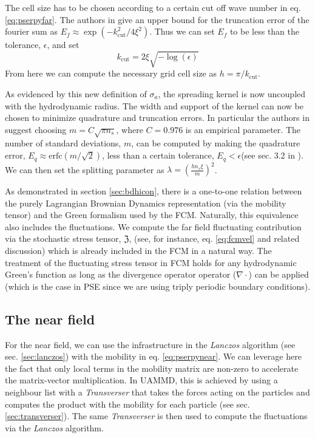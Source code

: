\documentclass[ twoside,openright,titlepage,numbers=noenddot,%
headinclude,footinclude,cleardoublepage=empty,abstract=on,
BCOR=5mm,paper=a4,fontsize=11pt, dvipsnames
]{scrreprt}
\newcommand{\uammd}{\gls{UAMMD}\xspace}
\begin{document}
The cell size has to be chosen according to a certain cut off wave number in eq. \eqref{eq:pserpyfar}. The authors in \cite{Lindbo2010} give an upper bound for the truncation error of the fourier sum as $E_f \approx \exp(-k_{\textrm{cut}}^2/4\xi^2)$. Thus we can set $E_f$ to be less than the tolerance, $\epsilon$, and set
\begin{equation}
  k_{\textrm{cut}} = 2\xi\sqrt{-\log(\epsilon)}
\end{equation}
From here we can compute the necessary grid cell size as $h = \pi/k_{\textrm{cut}}$.

As evidenced by this new definition of $\sigma_a$, the spreading kernel is now uncoupled with the hydrodynamic radius. The width and support of the kernel can now be chosen to minimize quadrature and truncation errors. In particular the authors in \cite{Lindbo2011} suggest choosing $m = C\sqrt{\pi n_s}$, where $C = 0.976$ is an empirical parameter. The number of standard deviations, $m$, can be computed by making the quadrature error, $E_q \approx \textrm{erfc}(m/\sqrt{2})$, less than a certain tolerance, $E_q<\epsilon$(see sec. 3.2 in \cite{Lindbo2011}). We can then set the splitting parameter as $\lambda = \left(\frac{hn_s\xi}{m}\right)^2$.

As demonstrated in section \ref{sec:bdhicon}, there is a one-to-one relation between the purely Lagrangian Brownian Dynamics representation (via the mobility tensor) and the Green formalism used by the \gls{FCM}. Naturally, this equivalence also includes the fluctuations. We compute the far field fluctuating contribution via the stochastic stress tensor, $\mathfrak{Z}$, (see, for instance, eq. \eqref{eq:fcmvel} and related discussion) which is already included in the \gls{FCM} in a natural way. The treatment of the fluctuating stress tensor in \gls{FCM} holds for any hydrodynamic Green's function as long as the divergence operator operator ($\nabla\cdot$) can be applied (which is the case in \gls{PSE} since we are using triply periodic boundary conditions).
\subsection*{The near field}

For the near field, we can use the infrastructure in the \emph{Lanczos} algorithm (see sec. \ref{sec:lanczos}) with the mobility in eq. \eqref{eq:pserpynear}. We can leverage here the fact that only local terms in the mobility matrix are non-zero to accelerate the matrix-vector multiplication. In \uammd, this is achieved by using a neighbour list with a \emph{Transverser} that takes the forces acting on the particles and computes the product with the mobility for each particle (see sec. \ref{sec:transverser}). The same \emph{Transverser} is then used to compute the fluctuations via the \emph{Lanczos} algorithm.
\end{document}
